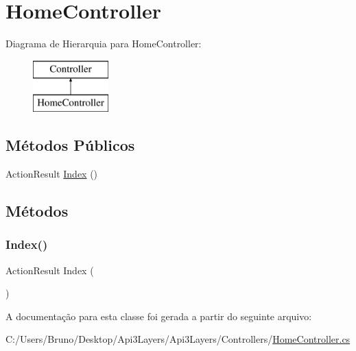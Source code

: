 \hypertarget{classApi3Layers_1_1Controllers_1_1HomeController}{}\section{Home\+Controller}
\label{classApi3Layers_1_1Controllers_1_1HomeController}
Diagrama de Hierarquia para Home\+Controller\+:\begin{figure}[H]
\begin{center}
\leavevmode
\includegraphics[height=2.000000cm]{d5/d1b/classApi3Layers_1_1Controllers_1_1HomeController}
\end{center}
\end{figure}
\subsection*{Métodos Públicos}
\begin{DoxyCompactItemize}
\item 
Action\+Result \hyperlink{classApi3Layers_1_1Controllers_1_1HomeController_a82bdd581a9c68d02c11ac8160aa5d60b}{Index} ()
\end{DoxyCompactItemize}


\subsection{Métodos}
\mbox{\label{classApi3Layers_1_1Controllers_1_1HomeController_a82bdd581a9c68d02c11ac8160aa5d60b}} 
\subsubsection{\texorpdfstring{Index()}{Index()}}
{\footnotesize\ttfamily Action\+Result Index (\begin{DoxyParamCaption}{ }\end{DoxyParamCaption})}



A documentação para esta classe foi gerada a partir do seguinte arquivo\+:\begin{DoxyCompactItemize}
\item 
C\+:/\+Users/\+Bruno/\+Desktop/\+Api3\+Layers/\+Api3\+Layers/\+Controllers/\hyperlink{HomeController_8cs}{Home\+Controller.\+cs}\end{DoxyCompactItemize}
